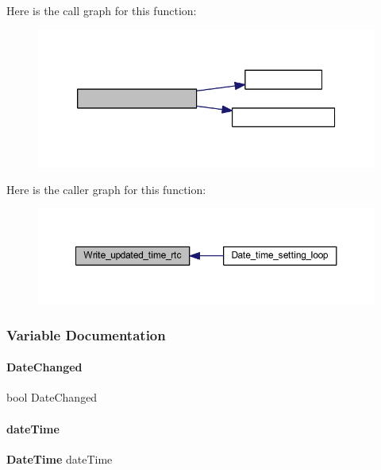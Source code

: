 Here is the call graph for this function\+:
\nopagebreak
\begin{figure}[H]
\begin{center}
\leavevmode
\includegraphics[width=339pt]{a00017_a2f6bf3793293cc3f2c09a91c3725a8af_cgraph}
\end{center}
\end{figure}
Here is the caller graph for this function\+:
\nopagebreak
\begin{figure}[H]
\begin{center}
\leavevmode
\includegraphics[width=350pt]{a00017_a2f6bf3793293cc3f2c09a91c3725a8af_icgraph}
\end{center}
\end{figure}


\subsubsection{Variable Documentation}
\mbox{\label{a00017_acaf1b7d1c378b3ba535f7989083a8c7e}} 
\paragraph{Date\+Changed}
{\footnotesize\ttfamily bool Date\+Changed}

\mbox{\label{a00017_a129e222d3019ef1ee0f6a7b86a51ae74}} 
\paragraph{date\+Time}
{\footnotesize\ttfamily \textbf{ Date\+Time} date\+Time}

